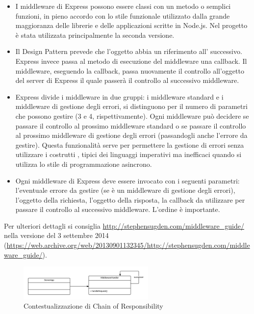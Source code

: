 \begin{itemize}
 \item I middleware di Express possono essere classi con un metodo  o semplici funzioni, in pieno accordo con lo stile funzionale utilizzato dalla grande maggioranza delle librerie e delle applicazioni scritte in Node.js. Nel progetto è stata utilizzata principalmente la seconda versione.

 \item Il Design Pattern prevede che l'oggetto  abbia un riferimento  all' successivo. Express invece passa al metodo di esecuzione del middleware una callback. Il middleware, eseguendo la callback, passa nuovamente il controllo all'oggetto del server di Express il quale passerà il controllo al successivo middleware.
 
 \item Express divide i middleware in due gruppi: i middleware standard e i middleware di gestione degli errori, si distinguono per il numero di parametri che possono gestire (3 e 4, rispettivamente). Ogni middleware può decidere se passare il controllo al prossimo middleware standard o se passare il controllo al prossimo middleware di gestione degli errori (passandogli anche l'errore da gestire). Questa funzionalità serve per permettere la gestione di errori senza utilizzare i costrutti , tipici dei linguaggi imperativi ma inefficaci quando si utilizza lo stile di programmazione asincrono.
 
 \item Ogni middleware di Express deve essere invocato con i seguenti parametri: l'eventuale errore da gestire (se è un middleware di gestione degli errori), l'oggetto della richiesta, l'oggetto della risposta, la callback da utilizzare per passare il controllo al successivo middleware. L'ordine è importante.
\end{itemize}

Per ulteriori dettagli si consiglia \url{http://stephensugden.com/middleware_guide/} nella versione del 3 settembre 2014 (\url{https://web.archive.org/web/20130901132345/http://stephensugden.com/middleware_guide/}).

\begin{figure}[H]
\centering \includegraphics[width=0.6\textwidth]{patterns/contestualizzazione/chain-of-responsability.png}
\caption{Contestualizzazione di Chain of Responsibility}
\label{fig:mvc}
\end{figure}

